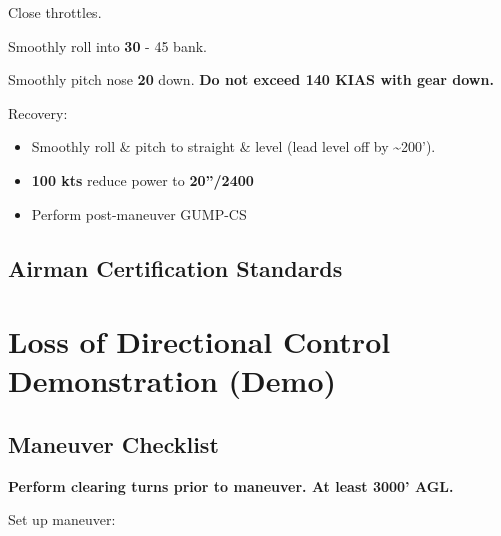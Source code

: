 {Close throttles.

Smoothly roll into \textbf{30\degree{}} - 45\degree{} bank.

Smoothly pitch nose \textbf{20\degree{}} down. \textbf{Do not exceed 140 KIAS with gear down.}

Recovery:
\begin{itemize}[label={}]
\item Smoothly roll \& pitch to straight \& level (lead level off by \~{}200’).
\item \textbf{100 kts} reduce power to \textbf{20''/2400}
\item Perform post-maneuver GUMP-CS
\end{itemize}
\subsection{Airman Certification Standards}
\newpage

\section{Loss of Directional Control Demonstration (\vmc Demo)}
\subsection{Maneuver Checklist}

\textbf{Perform clearing turns prior to maneuver. At least 3000' AGL.}

Set up maneuver:

}

